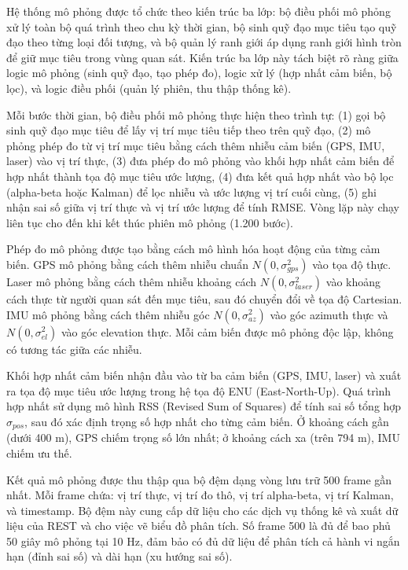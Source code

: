 \hspace{0.5cm} Hệ thống mô phỏng được tổ chức theo kiến trúc ba lớp: bộ điều phối mô phỏng xử lý toàn bộ quá trình theo chu kỳ thời gian, bộ sinh quỹ đạo mục tiêu tạo quỹ đạo theo từng loại đối tượng, và bộ quản lý ranh giới áp dụng ranh giới hình tròn để giữ mục tiêu trong vùng quan sát. Kiến trúc ba lớp này tách biệt rõ ràng giữa logic mô phỏng (sinh quỹ đạo, tạo phép đo), logic xử lý (hợp nhất cảm biến, bộ lọc), và logic điều phối (quản lý phiên, thu thập thống kê).

Mỗi bước thời gian, bộ điều phối mô phỏng thực hiện theo trình tự: (1) gọi bộ sinh quỹ đạo mục tiêu để lấy vị trí mục tiêu tiếp theo trên quỹ đạo, (2) mô phỏng phép đo từ vị trí mục tiêu bằng cách thêm nhiễu cảm biến (GPS, IMU, laser) vào vị trí thực, (3) đưa phép đo mô phỏng vào khối hợp nhất cảm biến để hợp nhất thành tọa độ mục tiêu ước lượng, (4) đưa kết quả hợp nhất vào bộ lọc (alpha-beta hoặc Kalman) để lọc nhiễu và ước lượng vị trí cuối cùng, (5) ghi nhận sai số giữa vị trí thực và vị trí ước lượng để tính RMSE. Vòng lặp này chạy liên tục cho đến khi kết thúc phiên mô phỏng (1.200 bước).

Phép đo mô phỏng được tạo bằng cách mô hình hóa hoạt động của từng cảm biến. GPS mô phỏng bằng cách thêm nhiễu chuẩn $N(0, \sigma_{gps}^2)$ vào tọa độ thực. Laser mô phỏng bằng cách thêm nhiễu khoảng cách $N(0, \sigma_{laser}^2)$ vào khoảng cách thực từ người quan sát đến mục tiêu, sau đó chuyển đổi về tọa độ Cartesian. IMU mô phỏng bằng cách thêm nhiễu góc $N(0, \sigma_{az}^2)$ vào góc azimuth thực và $N(0, \sigma_{el}^2)$ vào góc elevation thực. Mỗi cảm biến được mô phỏng độc lập, không có tương tác giữa các nhiễu.

Khối hợp nhất cảm biến nhận đầu vào từ ba cảm biến (GPS, IMU, laser) và xuất ra tọa độ mục tiêu ước lượng trong hệ tọa độ ENU (East-North-Up). Quá trình hợp nhất sử dụng mô hình RSS (Revised Sum of Squares) để tính sai số tổng hợp $\sigma_{pos}$, sau đó xác định trọng số hợp nhất cho từng cảm biến. Ở khoảng cách gần (dưới 400 m), GPS chiếm trọng số lớn nhất; ở khoảng cách xa (trên 794 m), IMU chiếm ưu thế.

Kết quả mô phỏng được thu thập qua bộ đệm dạng vòng lưu trữ 500 frame gần nhất. Mỗi frame chứa: vị trí thực, vị trí đo thô, vị trí alpha-beta, vị trí Kalman, và timestamp. Bộ đệm này cung cấp dữ liệu cho các dịch vụ thống kê và xuất dữ liệu của REST và cho việc vẽ biểu đồ phân tích. Số frame 500 là đủ để bao phủ 50 giây mô phỏng tại 10 Hz, đảm bảo có đủ dữ liệu để phân tích cả hành vi ngắn hạn (đỉnh sai số) và dài hạn (xu hướng sai số).

